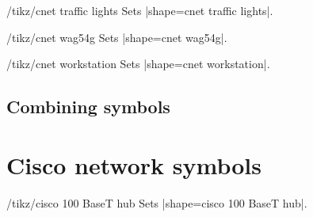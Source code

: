 \documentclass[a4paper]{ltxdoc}
\begin{document}
\begin{stylekey}{/tikz/cnet traffic lights}
Sets |shape={cnet traffic lights}|.
\begin{codeexample}[preamble={\usetikzlibrary{shapes.cnet.trafficlights}}]
\end{codeexample}
\end{stylekey}

\begin{stylekey}{/tikz/cnet wag54g}
Sets |shape={cnet wag54g}|.
\begin{codeexample}[preamble={\usetikzlibrary{shapes.cnet.wag54g}}]
\end{codeexample}
\end{stylekey}

\begin{stylekey}{/tikz/cnet workstation}
Sets |shape={cnet workstation}|.
\begin{codeexample}[preamble={\usetikzlibrary{shapes.cnet.workstation}}]
\end{codeexample}
\end{stylekey}

\subsection{Combining symbols}
\label{sec: combining-symbols}

\begin{codeexample}[preamble={\usetikzlibrary{shapes.cnet.car}}]
\end{codeexample}

\begin{codeexample}[preamble={\usetikzlibrary{shapes.cnet.smartphone}}]
\end{codeexample}


\section{Cisco network symbols}
\label{sec:cisco-network-symbols}

\begin{stylekey}{/tikz/cisco 100 BaseT hub}
Sets |shape={cisco 100 BaseT hub}|.
\begin{codeexample}[preamble={\usetikzlibrary{shapes.cisco.100basethub}}]
\end{codeexample}
\end{stylekey}
\end{document}
